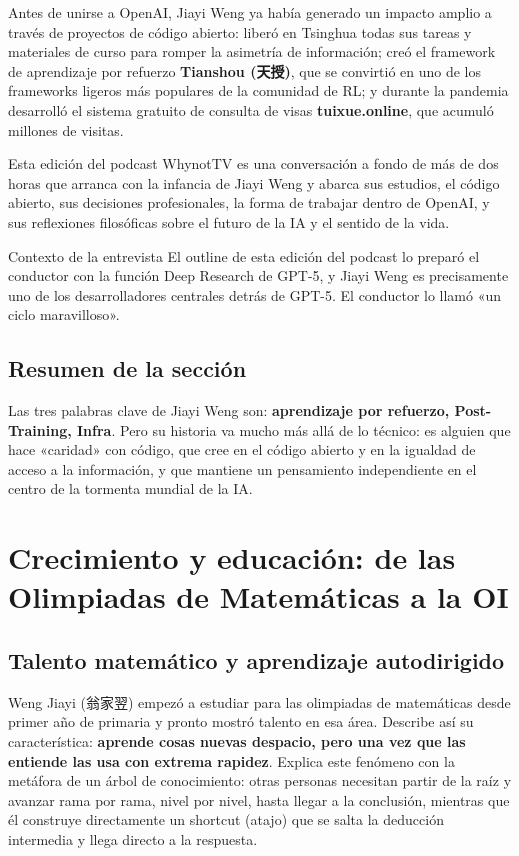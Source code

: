 \documentclass[a4paper]{article}
\begin{document}
Antes de unirse a OpenAI, Jiayi Weng ya había generado un impacto amplio a través de proyectos de código abierto: liberó en Tsinghua todas sus tareas y materiales de curso para romper la asimetría de información; creó el framework de aprendizaje por refuerzo \textbf{Tianshou (天授)}, que se convirtió en uno de los frameworks ligeros más populares de la comunidad de RL; y durante la pandemia desarrolló el sistema gratuito de consulta de visas \textbf{tuixue.online}, que acumuló millones de visitas.

Esta edición del podcast WhynotTV es una conversación a fondo de más de dos horas que arranca con la infancia de Jiayi Weng y abarca sus estudios, el código abierto, sus decisiones profesionales, la forma de trabajar dentro de OpenAI, y sus reflexiones filosóficas sobre el futuro de la IA y el sentido de la vida.

\begin{knowledgebox}{Contexto de la entrevista}
El outline de esta edición del podcast lo preparó el conductor con la función Deep Research de GPT-5, y Jiayi Weng es precisamente uno de los desarrolladores centrales detrás de GPT-5. El conductor lo llamó «un ciclo maravilloso».
\end{knowledgebox}

\subsection{Resumen de la sección}

Las tres palabras clave de Jiayi Weng son: \textbf{aprendizaje por refuerzo, Post-Training, Infra}. Pero su historia va mucho más allá de lo técnico: es alguien que hace «caridad» con código, que cree en el código abierto y en la igualdad de acceso a la información, y que mantiene un pensamiento independiente en el centro de la tormenta mundial de la IA.

\section{Crecimiento y educación: de las Olimpiadas de Matemáticas a la OI}

\subsection{Talento matemático y aprendizaje autodirigido}

Weng Jiayi (翁家翌) empezó a estudiar para las olimpiadas de matemáticas desde primer año de primaria y pronto mostró talento en esa área. Describe así su característica: \textbf{aprende cosas nuevas despacio, pero una vez que las entiende las usa con extrema rapidez}. Explica este fenómeno con la metáfora de un árbol de conocimiento: otras personas necesitan partir de la raíz y avanzar rama por rama, nivel por nivel, hasta llegar a la conclusión, mientras que él construye directamente un shortcut (atajo) que se salta la deducción intermedia y llega directo a la respuesta.
\end{document}
